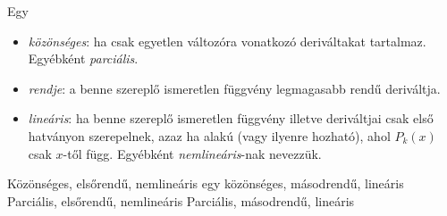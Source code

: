 Egy \de{}
\begin{itemize}
\item {\it közönséges}: ha csak egyetlen változóra vonatkozó deriváltakat tartalmaz.
Egyébként {\it parciális}.
\item {\it rendje}: a benne szereplő ismeretlen függvény legmagasabb rendű deriváltja.
\item {\it lineáris}: ha benne szereplő ismeretlen függvény illetve deriváltjai csak első
hatványon szerepelnek, azaz ha
alakú (vagy ilyenre hozható), ahol $P_k(x)$ csak $x$-től függ.
Egyébként {\it nemlineáris}-nak nevezzük.
\end{itemize}
\Dnew
\newpage
Közönséges, elsőrendű, nemlineáris \de{:}
egy közönséges, másodrendű, lineáris 
Parciális, elsőrendű, nemlineáris \de{:}
Parciális, másodrendű, lineáris \de{:}


